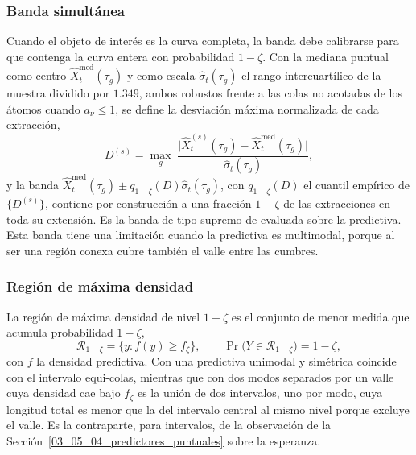 \subsubsection{Banda simultánea}
\label{03_05_05_02_banda_simultanea}
Cuando el objeto de interés es la curva completa, la banda debe calibrarse para que contenga la curva entera con probabilidad $1-\zeta$. Con la mediana puntual como centro $\widehat{X}_t^{\mathrm{med}}(\tau_g)$ y como escala $\widehat{\sigma}_t(\tau_g)$ el rango intercuartílico de la muestra dividido por $1.349$, ambos robustos frente a las colas no acotadas de los átomos cuando $a_\nu \le 1$, se define la desviación máxima normalizada de cada extracción,
\begin{equation}\label{eq:supnorma}
    D^{(s)} = \max_{g}\;\frac{\bigl|\widehat{X}_t^{(s)}(\tau_g) - \widehat{X}_t^{\mathrm{med}}(\tau_g)\bigr|}{\widehat{\sigma}_t(\tau_g)},
\end{equation}
y la banda $\widehat{X}_t^{\mathrm{med}}(\tau_g) \pm q_{1-\zeta}(D)\widehat{\sigma}_t(\tau_g)$, con $q_{1-\zeta}(D)$ el cuantil empírico de $\{D^{(s)}\}$, contiene por construcción a una fracción $1-\zeta$ de las extracciones en toda su extensión. Es la banda de tipo supremo de \citet{03_05_degras2011bands} evaluada sobre la predictiva. Esta banda tiene una limitación cuando la predictiva es multimodal, porque al ser una región conexa cubre también el valle entre las cumbres.

\subsubsection{Región de máxima densidad}
\label{03_05_05_03_hdr}

La región de máxima densidad de nivel $1-\zeta$ \citep{03_05_hyndman1996hdr} es el conjunto de menor medida que acumula probabilidad $1-\zeta$,
\begin{equation}\label{eq:hdr}
    \mathcal{R}_{1-\zeta} = \bigl\{y : f(y) \geq f_{\zeta}\bigr\},
    \qquad
    \Pr\bigl(Y \in \mathcal{R}_{1-\zeta}\bigr) = 1-\zeta,
\end{equation}
con $f$ la densidad predictiva. Con una predictiva unimodal y simétrica coincide con el intervalo equi-colas, mientras que con dos modos separados por un valle cuya densidad cae bajo $f_\zeta$ es la unión de dos intervalos, uno por modo, cuya longitud total es menor que la del intervalo central al mismo nivel porque excluye el valle. Es la contraparte, para intervalos, de la observación de la Sección~\ref{03_05_04_predictores_puntuales} sobre la esperanza.\\

